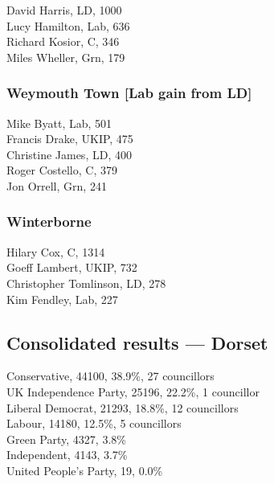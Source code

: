 \documentclass[a4paper,openany,10pt]{book}
\begin{document}


David Harris, LD, 1000\\
Lucy Hamilton, Lab, 636\\
Richard Kosior, C, 346\\
Miles Wheller, Grn, 179\\


\subsubsection*{Weymouth Town \hspace*{\fill}\nolinebreak[1]%
\enspace\hspace*{\fill}
[Lab gain from LD]}



Mike Byatt, Lab, 501\\
Francis Drake, UKIP, 475\\
Christine James, LD, 400\\
Roger Costello, C, 379\\
Jon Orrell, Grn, 241\\


\subsubsection*{Winterborne}



Hilary Cox, C, 1314\\
Goeff Lambert, UKIP, 732\\
Christopher Tomlinson, LD, 278\\
Kim Fendley, Lab, 227\\




\subsection*{Consolidated results --- Dorset}
Conservative, 44100, 38.9\%, 27 councillors\\
UK Independence Party, 25196, 22.2\%, 1 councillor\\
Liberal Democrat, 21293, 18.8\%, 12 councillors\\
Labour, 14180, 12.5\%, 5 councillors\\
Green Party, 4327, 3.8\% \\
Independent, 4143, 3.7\% \\
United People's Party, 19, 0.0\% \\
\end{document}
